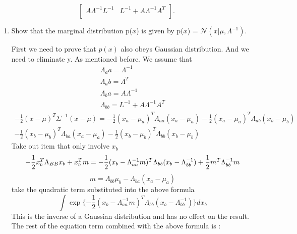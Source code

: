 \documentclass[a4paper]{article}
\begin{document}
\begin{enumerate}
$$\begin{bmatrix}
		A\Lambda^{-1}L^{-1} & L^{-1} + A\Lambda^{-1}A^{T}\\
		\end{bmatrix}
		.
		$$
		\begin{enumerate}
			\item
			Show that the marginal distribution p($x$) is given by p($x$) = $\mathcal{N}(x|\mu,\Lambda^{-1})$.
			\begin{solution}
				First we need to prove that $p(x)$ also obeys Gaussian distribution. And we need to eliminate y. As mentioned before.
				We assume that
				\begin{equation*}
				\begin{split}
					\Lambda_aa = \Lambda^{-1}\\
					\Lambda_ab = \Lambda^{T}\\
					\Lambda_ba = A\Lambda^{-1}\\
					\Lambda_{bb}=L^{-1}+A\Lambda^{-1}A^T
				\end{split}
				\end{equation*}
				\begin{equation*}				
				\begin{split}
					-\frac{1}{2}(x-\mu)^{T}\Sigma^{-1}(x-\mu)=
					-\frac{1}{2}(x_a-\mu_a)^{T}\Lambda_{aa}(x_a-\mu_a)
					-\frac{1}{2}(x_a-\mu_a)^{T}\Lambda_{ab}(x_b-\mu_b)\\
					-\frac{1}{2}(x_b-\mu_b)^{T}\Lambda_{ba}(x_a-\mu_a)
					-\frac{1}{2}(x_b-\mu_b)^{T}\Lambda_{bb}(x_b-\mu_b)
				\end{split}
				\end{equation*}
				Take out item that only involve $x_b$
				\begin{equation*}
					-\frac{1}{2}x_b^T\Lambda_{BB}x_b + x_b^Tm=-\frac{1}{2}(x_b-\Lambda_{aa}^{-1}m)^{T}\Lambda_{bb}(x_b-\Lambda_{bb}^{-1})+\frac{1}{2}m^T\Lambda_{bb}^{-1}m\\
				\end{equation*}
				\begin{equation*}
					m=\Lambda_{bb}\mu_b-\Lambda_{ba}(x_a-\mu_a)
				\end{equation*}
				take the quadratic term substituted into the above formula
				\begin{equation*}
					\int \exp\{-\frac{1}{2}(x_b-\Lambda_{aa}^{-1}m)^{T}\Lambda_{bb}(x_b-\Lambda_{bb}^{-1})\}dx_b
				\end{equation*}
				This is the inverse of a Gaussian distribution and has no effect on the result.
				The rest of the equation term combined with the above formula is :
				\begin{equation*}

\end{equation*}
\end{solution}
\end{enumerate}
\end{enumerate}
\end{document}
